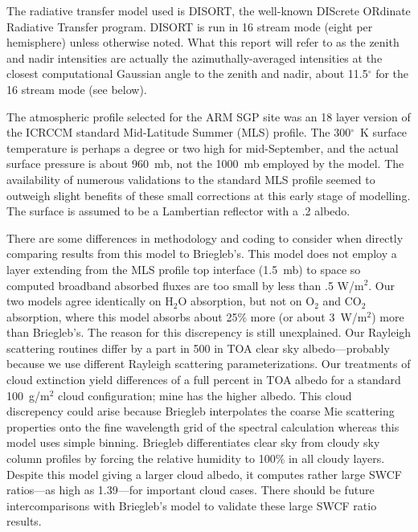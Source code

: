 The radiative transfer model used is DISORT, the well-known DIScrete
ORdinate Radiative Transfer program. DISORT is run in 16 stream mode
(eight per hemisphere) unless otherwise noted. 
What this report will refer to as the 
zenith and nadir intensities are actually the
azimuthally-averaged intensities at the closest computational Gaussian
angle to the zenith and nadir, about 11.5$^\circ$ for the 16 stream
mode (see below).

The atmospheric profile selected for the ARM SGP site was an 18 layer
version of the ICRCCM standard Mid-Latitude Summer (MLS) profile. 
The 300$^\circ$~K surface
temperature is perhaps a degree or two high for mid-September, and the
actual surface pressure is about 960~mb, not the 1000~mb employed by
the model. 
The availability of numerous validations to the standard MLS profile
seemed to outweigh slight benefits of these small corrections at this
early stage of modelling.
The surface is assumed to be a Lambertian reflector 
with a .2 albedo.

There are some differences in methodology and coding to consider when 
directly comparing results from this model to Briegleb's.
This model does not employ a layer extending from the MLS profile
top interface (1.5~mb) to space so computed broadband absorbed
fluxes are too small by less than .5 W/m$^2$.  
Our two models agree identically on H$_2$O absorption, but not on O$_2$
and CO$_2$ absorption, where this model absorbs about 25\% more (or
about 3~W/m$^2$) more than Briegleb's. 
The reason for this discrepency is still unexplained. 
Our Rayleigh scattering routines differ by a part in
500 in TOA clear sky albedo---probably because we use different
Rayleigh scattering parameterizations. 
Our treatments of cloud
extinction yield differences of a full percent in TOA albedo for a
standard 100~g/m$^2$ cloud configuration; mine has the higher albedo. 
This cloud discrepency could arise because Briegleb interpolates
the coarse Mie scattering properties onto the fine wavelength grid of
the spectral calculation whereas this model uses simple binning.
Briegleb differentiates clear sky from cloudy sky column
profiles by forcing the relative humidity to 100\% in all cloudy
layers. 
Despite this model giving a larger cloud albedo, it 
computes rather large SWCF ratios---as high as 1.39---for important 
cloud cases. 
There should be future intercomparisons with Briegleb's model 
to validate these large SWCF ratio results.
\medskip
{}\nobreak

